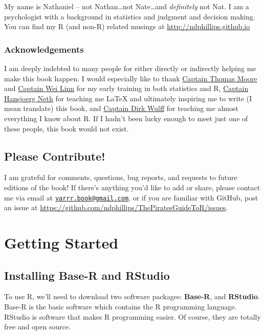 \documentclass[]{book}
\theoremstyle{definition}
\theoremstyle{definition}
\theoremstyle{remark}
\begin{document}
My name is Nathaniel -- not Nathan\ldots{}not Nate\ldots{}and
\emph{definitely} not Nat. I am a psychologist with a background in
statistics and judgment and decision making. You can find my R (and
non-R) related musings at \url{http://ndphillips.github.io}

\subsection{Acknowledgements}\label{acknowledgements}

I am deeply indebted to many people for either directly or indirectly
helping me make this book happen. I would especially like to thank
\href{https://www.grinnell.edu/users/mooret}{Captain Thomas Moore} and
\href{http://www.math.ohiou.edu/people/directory/linwei}{Captain Wei
Linn} for my early training in both statistics and R,
\href{https://www.spds.uni-konstanz.de/hans-neth}{Captain Hansjoerg
Neth} for teaching me LaTeX and ultimately inspiring me to write (I mean
translate) this book, and
\href{https://psycho.unibas.ch/fakultaet/personen/profil/person/wulff/}{Captain
Dirk Wulff} for teaching me almost everything I know about R. If I
hadn't been lucky enough to meet just one of these people, this book
would not exist.

\section{Please Contribute!}\label{please-contribute}

I am grateful for comments, questions, bug reports, and requests to
future editions of the book! If there's anything you'd like to add or
share, please contact me via email at
\href{mailto:yarrr.book@gmail.com}{\nolinkurl{yarrr.book@gmail.com}}, or
if you are familiar with GitHub, post an issue at
\url{https://github.com/ndphillips/ThePiratesGuideToR/issues}.

\chapter{Getting Started}\label{started}

\section{Installing Base-R and
RStudio}\label{installing-base-r-and-rstudio}

To use R, we'll need to download two software packages: \textbf{Base-R},
and \textbf{RStudio}. Base-R is the basic software which contains the R
programming language. RStudio is software that makes R programming
easier. Of course, they are totally free and open source.
\end{document}
